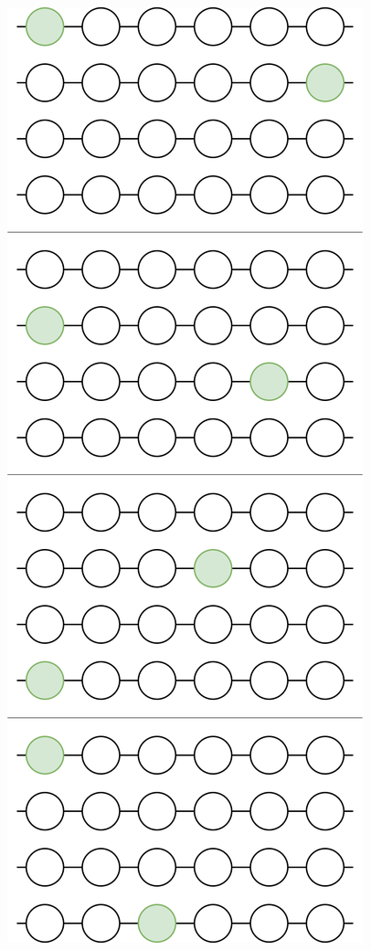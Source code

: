 \begin{minipage}{0.35\textwidth}
    \centering
    \includegraphics[width=\textwidth]{../Images/ukulele-fretboard-tonics.png}
    \label{fig:ukulele_tonic_intervals}
\end{minipage}

